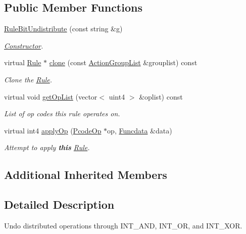 \subsection*{Public Member Functions}
\begin{DoxyCompactItemize}
\item 
\mbox{\hyperlink{class_rule_bit_undistribute_a2159c6998ef524f7ea09b573a08eed3b}{Rule\+Bit\+Undistribute}} (const string \&g)
\begin{DoxyCompactList}\small\item\em \mbox{\hyperlink{class_constructor}{Constructor}}. \end{DoxyCompactList}\item 
virtual \mbox{\hyperlink{class_rule}{Rule}} $\ast$ \mbox{\hyperlink{class_rule_bit_undistribute_a496c93a2aad0d79a776a71160529d830}{clone}} (const \mbox{\hyperlink{class_action_group_list}{Action\+Group\+List}} \&grouplist) const
\begin{DoxyCompactList}\small\item\em Clone the \mbox{\hyperlink{class_rule}{Rule}}. \end{DoxyCompactList}\item 
virtual void \mbox{\hyperlink{class_rule_bit_undistribute_ab8b99b7595b2533bde19beab4391a300}{get\+Op\+List}} (vector$<$ uint4 $>$ \&oplist) const
\begin{DoxyCompactList}\small\item\em List of op codes this rule operates on. \end{DoxyCompactList}\item 
virtual int4 \mbox{\hyperlink{class_rule_bit_undistribute_a01122a111d9e7ff6d741128cb8d9999d}{apply\+Op}} (\mbox{\hyperlink{class_pcode_op}{Pcode\+Op}} $\ast$op, \mbox{\hyperlink{class_funcdata}{Funcdata}} \&data)
\begin{DoxyCompactList}\small\item\em Attempt to apply {\bfseries{this}} \mbox{\hyperlink{class_rule}{Rule}}. \end{DoxyCompactList}\end{DoxyCompactItemize}
\subsection*{Additional Inherited Members}


\subsection{Detailed Description}
Undo distributed operations through I\+N\+T\+\_\+\+A\+ND, I\+N\+T\+\_\+\+OR, and I\+N\+T\+\_\+\+X\+OR. 


